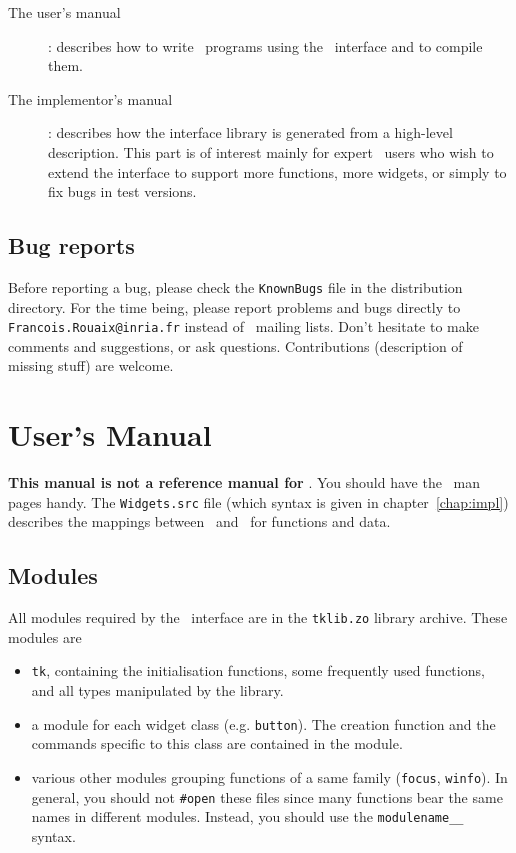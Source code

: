 \begin{description}
\item[The user's manual] : describes how to write \caml\ programs using the
\tk\ interface and to compile them. 
\item[The implementor's manual] : describes how the interface library is
generated from a high-level description. This part is of interest mainly for
expert \tk\ users who wish to extend the interface to support more
functions, more widgets, or simply to fix bugs in test versions.
\end{description} 

\section*{Bug reports}
Before reporting a bug, please check the \verb|KnownBugs| file in the
distribution directory.
For the time being, please report problems and bugs directly to
\verb|Francois.Rouaix@inria.fr| instead of \caml\ mailing lists.
Don't hesitate to make comments and suggestions, or ask questions.
Contributions (description of missing stuff) are welcome.

\chapter{User's Manual}
{\bf This manual is not a reference manual for \tk}. 
You should have the \tk\ man pages handy. The \verb|Widgets.src| file (which
syntax is given in chapter~\ref{chap:impl}) describes the mappings between
\tk\ and \caml\ for functions and data.

\section{Modules}
All modules required by the \tk\ interface are in the \verb|tklib.zo| 
library archive. These modules are
\begin{itemize}
\item \verb|tk|, containing the initialisation functions, some frequently
used functions, and all types manipulated by the library.

\item a module for each widget class (e.g. \verb|button|). The creation
function and the commands specific to this class are contained in the
module.

\item various other modules grouping functions of a same family
(\verb|focus|, \verb|winfo|). In general, you should not \verb|#open| these
files since many functions bear the same names in different modules.
Instead, you should use the \verb|modulename__| syntax.

\end{itemize} 

